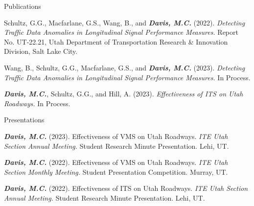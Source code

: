 \documentclass{resume} %
\begin{document}
\begin{rSection}{Publications}

Schultz, G.G., Macfarlane, G.S., Wang, B., and {\bf \em Davis, M.C.} (2022). {\em Detecting Traffic Data Anomalies in Longitudinal Signal Performance Measures.} Report No. UT-22.21, Utah Department of Transportation Research \& Innovation Division, Salt Lake City.

Wang, B., Schultz, G.G., Macfarlane, G.S., and {\bf \em Davis, M.C.} (2023). {\em Detecting Traffic Data Anomalies in Longitudinal Signal Performance Measures.} In Process.

{\bf \em Davis, M.C.}, Schultz, G.G., and Hill, A. (2023). {\em 
Effectiveness of ITS on Utah Roadways.} In Process.

\end{rSection}


% 
% 
% 
% 

\clearpage
\begin{rSection}{Presentations}

{\bf \em Davis, M.C.} (2023). {Effectiveness of VMS on Utah Roadways.} {\em ITE Utah Section Annual Meeting.} Student Research Minute Presentation. Lehi, UT.

{\bf \em Davis, M.C.} (2022). {Effectiveness of VMS on Utah Roadways.} {\em ITE Utah Section Monthly Meeting.} Student Presentation Competition. Murray, UT.

{\bf \em Davis, M.C.} (2022). {Effectiveness of ITS on Utah Roadways.} {\em ITE Utah Section Annual Meeting.} Student Research Minute Presentation. Lehi, UT. 

\end{rSection}
\end{document}
